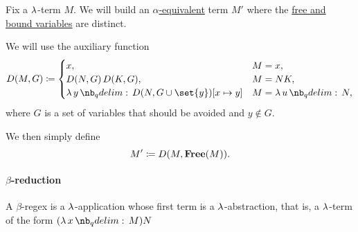 \begin{algorithm}\label{alg:alpha_equivalent_term_with_distinct_variables}
  Fix a \( \mathrm{\lambda} \)-term \( M \). We will build an \hyperref[def:untyped_lambda_term_alpha_equivalence]{\( \alpha \)-equivalent} term \( M' \) where the \hyperref[def:lambda_variable_freeness]{free and bound variables} are distinct.

  We will use the auxiliary function
  \begin{equation*}
    D(M, G) \coloneqq \begin{cases}
      x,                                          &M = x, \\
      D(N, G) \thinspace D(K, G),                 &M = NK, \\
      \qabs y D(N, G \cup \set{ y })[x \mapsto y] &M = \qabs u N,
    \end{cases}
  \end{equation*}
  where \( G \) is a set of variables that should be avoided and \( y \not\in G \).

  We then simply define
  \begin{equation*}
    M' \coloneqq D(M, \op*{Free}(M)).
  \end{equation*}
\end{algorithm}

\paragraph{\( \beta \)-reduction}

\begin{definition}\label{def:beta_redex}
  A \( \beta \)-regex is a \( \mathrm{\lambda} \)-application whose first term is a \( \mathrm{\lambda} \)-abstraction, that is, a \( \mathrm{\lambda} \)-term of the form \( (\qabs x M) N \)
\end{definition}
